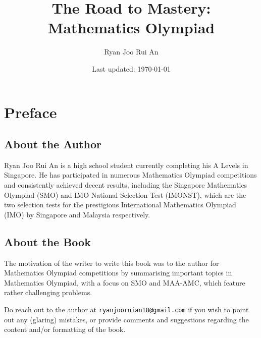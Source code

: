 \documentclass[12pt,a4 paper]{extreport}
\begin{document}


\begin{titlepage}
\title{The Road to Mastery:\\
Mathematics Olympiad}
\author{Ryan Joo Rui An}
\date{Last updated: \today}
\end{titlepage}

\maketitle

\chapter*{Preface}
\section*{About the Author}
Ryan Joo Rui An is a high school student currently completing his A Levels in Singapore. He has participated in numerous Mathematics Olympiad competitions and consistently achieved decent results, including the Singapore Mathematics Olympiad (SMO) and IMO National Selection Test (IMONST), which are the two selection tests for the prestigious International Mathematics Olympiad (IMO) by Singapore and Malaysia respectively.

\section*{About the Book}
The motivation of the writer to write this book was to the author for Mathematics Olympiad competitions by summarising important topics in Mathematics Olympiad, with a focus on SMO and MAA-AMC, which feature rather challenging problems.

Do reach out to the author at \texttt{ryanjooruian18@gmail.com} if you wish to point out any (glaring) mistakes, or provide comments and suggestions regarding the content and/or formatting of the book.
\end{document}
